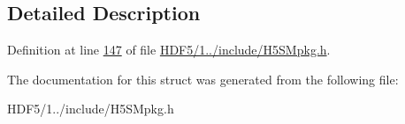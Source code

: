 \subsection{Detailed Description}


Definition at line \hyperlink{_h_d_f5_21_810_81_2include_2_h5_s_mpkg_8h_source_l00147}{147} of file \hyperlink{_h_d_f5_21_810_81_2include_2_h5_s_mpkg_8h_source}{H\+D\+F5/1../include/\+H5\+S\+Mpkg.\+h}.



The documentation for this struct was generated from the following file\+:\begin{DoxyCompactItemize}
\item 
H\+D\+F5/1../include/\+H5\+S\+Mpkg.\+h\end{DoxyCompactItemize}
